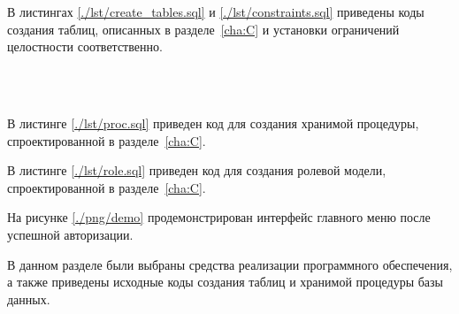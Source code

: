 В листингах \ref{./lst/create_tables.sql} и \ref{./lst/constraints.sql} приведены коды создания таблиц, описанных в разделе~\ref{cha:C} и установки ограничений целостности соответственно.

~\\
~


В листинге \ref{./lst/proc.sql} приведен код для создания хранимой процедуры, спроектированной в разделе~\ref{cha:C}.

В листинге \ref{./lst/role.sql} приведен код для создания ролевой модели, спроектированной в разделе~\ref{cha:C}.

На рисунке \ref{./png/demo} продемонстрирован интерфейс главного меню после успешной авторизации.

В данном разделе были выбраны средства реализации программного обеспечения, а также приведены исходные коды создания таблиц и хранимой процедуры базы данных.
